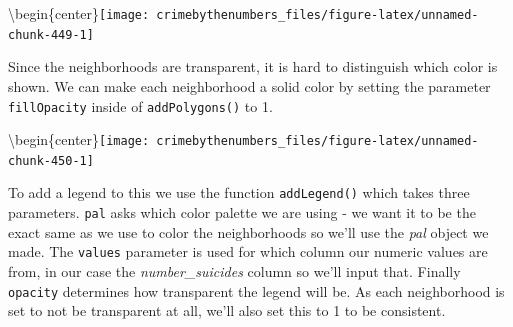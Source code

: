 \documentclass[
]{krantz}
\makeatletter
\newenvironment{Shaded}{\begin{snugshade}}{\end{snugshade}}
\newcommand{\AttributeTok}[1]{\textcolor[rgb]{0.61,0.61,0.61}{#1}}
\newcommand{\DecValTok}[1]{\textcolor[rgb]{0.06,0.06,0.06}{#1}}
\newcommand{\FunctionTok}[1]{\textcolor[rgb]{0,0,0}{#1}}
\newcommand{\NormalTok}[1]{#1}
\newcommand{\OtherTok}[1]{\textcolor[rgb]{0.37,0.37,0.37}{#1}}
\newcommand{\SpecialCharTok}[1]{\textcolor[rgb]{0,0,0}{#1}}
\newcommand{\StringTok}[1]{\textcolor[rgb]{0.5,0.5,0.5}{#1}}
\newenvironment{kframe}{%
\medskip{}
\setlength{\fboxsep}{.8em}
 \def\at@end@of@kframe{}%
 \ifinner\ifhmode%
  \def\at@end@of@kframe{\end{minipage}}%
  \begin{minipage}{\columnwidth}%
 \fi\fi%
 \def\FrameCommand##1{\hskip\@totalleftmargin \hskip-\fboxsep
 \colorbox{shadecolor}{##1}\hskip-\fboxsep
     \hskip-\linewidth \hskip-\@totalleftmargin \hskip\columnwidth}%
 \MakeFramed {\advance\hsize-\width
   \@totalleftmargin\z@ \linewidth\hsize
   \@setminipage}}%
 {\par\unskip\endMakeFramed%
 \at@end@of@kframe}
\renewenvironment{Shaded}{\begin{kframe}}{\end{kframe}}
\makeatother
\begin{document}
\textbackslash begin\{center\}\texttt{[image: crimebythenumbers\_files/figure-latex/unnamed-chunk-449-1]}

Since the neighborhoods are transparent, it is hard to distinguish which color is shown. We can make each neighborhood a solid color by setting the parameter \texttt{fillOpacity} inside of \texttt{addPolygons()} to 1.

\begin{Shaded}
\end{Shaded}

\textbackslash begin\{center\}\texttt{[image: crimebythenumbers\_files/figure-latex/unnamed-chunk-450-1]}

To add a legend to this we use the function \texttt{addLegend()} which takes three parameters. \texttt{pal} asks which color palette we are using - we want it to be the exact same as we use to color the neighborhoods so we'll use the \emph{pal} object we made. The \texttt{values} parameter is used for which column our numeric values are from, in our case the \emph{number\_suicides} column so we'll input that. Finally \texttt{opacity} determines how transparent the legend will be. As each neighborhood is set to not be transparent at all, we'll also set this to 1 to be consistent.
\end{document}
